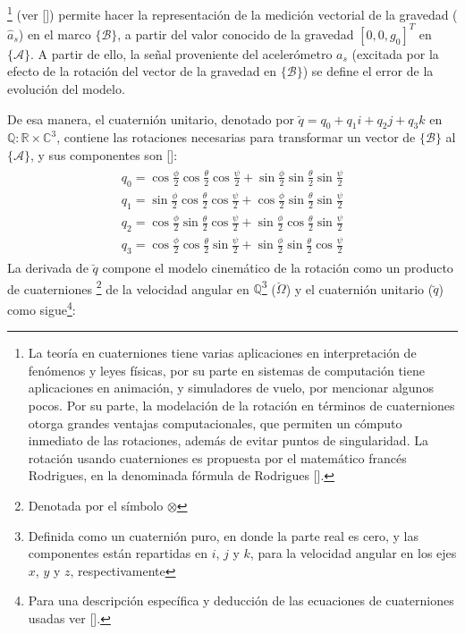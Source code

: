 \documentclass[10pt]{report}
\numberwithin{equation}{chapter}
\numberwithin{algorithm}{chapter}
\newcommand{\bcite}[1]{[\cite{#1}]}
\newcommand{\marco}[1]{\{\mathcal{#1}\}}
\begin{document}
\footnote{La teoría en cuaterniones tiene varias aplicaciones en interpretación de fenómenos y leyes físicas, por su parte en sistemas de computación tiene aplicaciones en animación, y simuladores de vuelo, por mencionar algunos pocos. Por su parte, la modelación de la rotación en términos de cuaterniones otorga grandes ventajas computacionales, que permiten un cómputo inmediato de las rotaciones, además de evitar puntos de singularidad. La rotación usando cuaterniones es propuesta por el matemático francés Rodrigues, en la denominada fórmula de Rodrigues [\cite{Kuipers1999}].} (ver \bcite{Altmann1986}) permite hacer la representación de la medición vectorial de la gravedad ($\hat{a}_s$) en el marco $\marco{B}$, a partir del valor conocido de la gravedad $[0,0,g_0]^T$ en $\marco{A}$. A partir de ello, la señal proveniente del acelerómetro $a_s$ (excitada por la efecto de la rotación del vector de la gravedad en $\marco{B}$) se define el error de la evolución del modelo.
\par
De esa manera, el cuaternión unitario, denotado por $\breve{q}=q_0+q_1i+q_2j+q_3k$ en $\mathbb{Q}:\mathbb{R}\times\mathbb{C}^3$, contiene las rotaciones necesarias para transformar un vector de $\marco{B}$ al $\marco{A}$, y sus componentes son \bcite{Cai2011}:
\begin{gather}\label{modelo_ecc3}
\begin{array}{c}
q_0=\cos\frac{\phi}{2}\cos\frac{\theta}{2}\cos\frac{\psi}{2} + \sin\frac{\phi}{2}\sin\frac{\theta}{2}\sin\frac{\psi}{2}\\
q_1=\sin\frac{\phi}{2}\cos\frac{\theta}{2}\cos\frac{\psi}{2} + \cos\frac{\phi}{2}\sin\frac{\theta}{2}\sin\frac{\psi}{2}\\
q_2=\cos\frac{\phi}{2}\sin\frac{\theta}{2}\cos\frac{\psi}{2} + \sin\frac{\phi}{2}\cos\frac{\theta}{2}\sin\frac{\psi}{2}\\
q_3=\cos\frac{\phi}{2}\cos\frac{\theta}{2}\sin\frac{\psi}{2} + \sin\frac{\phi}{2}\sin\frac{\theta}{2}\cos\frac{\psi}{2}
\end{array}
\end{gather}
La derivada de $\breve{q}$ compone el modelo cinemático de la rotación como un producto de cuaterniones \footnote{Denotada por el símbolo $\otimes$} de la velocidad angular en $\mathbb{Q}$\footnote{Definida como un cuaternión puro, en donde la parte real es cero, y las componentes están repartidas en $i$, $j$ y $k$, para la velocidad angular en los ejes $x$, $y$ y $z$, respectivamente} ($\breve{\Omega}$) y el cuaternión unitario ($\breve{q}$) como sigue\footnote{ Para una descripción específica y deducción de las ecuaciones de cuaterniones usadas ver [\cite{Kuipers1999}].}:
\end{document}
